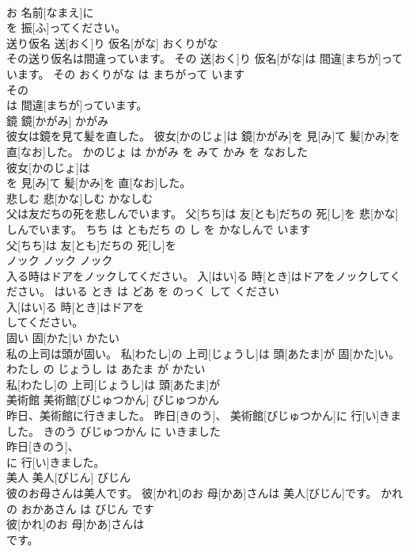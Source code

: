 \documentclass[8pt]{extreport}
\begin{document}
\begin{CJK}{UTF8}{min}
\\	お 名前[なまえ]に
\\	を 振[ふ]ってください。		
\\	送り仮名	送[おく]り 仮名[がな]	おくりがな	
\\	その送り仮名は間違っています。	その 送[おく]り 仮名[がな]は 間違[まちが]っています。	その おくりがな は まちがって います	
\\	その
\\	は 間違[まちが]っています。		
\\	鏡	鏡[かがみ]	かがみ	
\\	彼女は鏡を見て髪を直した。	彼女[かのじょ]は 鏡[かがみ]を 見[み]て 髪[かみ]を 直[なお]した。	かのじょ は かがみ を みて かみ を なおした	
\\	彼女[かのじょ]は
\\	を 見[み]て 髪[かみ]を 直[なお]した。		
\\	悲しむ	悲[かな]しむ	かなしむ	
\\	父は友だちの死を悲しんでいます。	父[ちち]は 友[とも]だちの 死[し]を 悲[かな]しんでいます。	ちち は ともだち の し を かなしんで います	
\\	父[ちち]は 友[とも]だちの 死[し]を
\\	ノック	ノック	ノック	
\\	入る時はドアをノックしてください。	入[はい]る 時[とき]はドアをノックしてください。	はいる とき は どあ を のっく して ください	
\\	入[はい]る 時[とき]はドアを
\\	してください。		
\\	固い	固[かた]い	かたい	
\\	私の上司は頭が固い。	私[わたし]の 上司[じょうし]は 頭[あたま]が 固[かた]い。	わたし の じょうし は あたま が かたい	
\\	私[わたし]の 上司[じょうし]は 頭[あたま]が
\\	美術館	美術館[びじゅつかん]	びじゅつかん	
\\	昨日、美術館に行きました。	昨日[きのう]、 美術館[びじゅつかん]に 行[い]きました。	きのう びじゅつかん に いきました	
\\	昨日[きのう]、
\\	に 行[い]きました。		
\\	美人	美人[びじん]	びじん	
\\	彼のお母さんは美人です。	彼[かれ]のお 母[かあ]さんは 美人[びじん]です。	かれ の おかあさん は びじん です	
\\	彼[かれ]のお 母[かあ]さんは
\\	です。		

\end{CJK}
\end{document}
